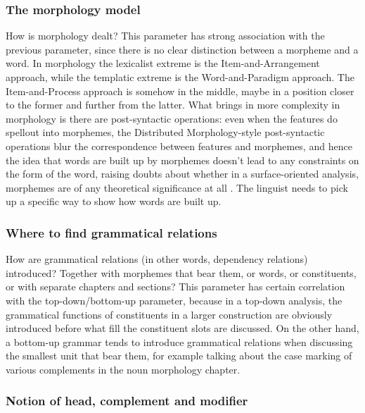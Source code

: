 \documentclass[UTF8, a4paper, oneside, scheme=plain]{ctexart}
\begin{document}
\subsubsection{The morphology model}

How is morphology dealt?
This parameter has strong association with the previous parameter, 
since there is no clear distinction between a morpheme and a word.
In morphology the lexicalist extreme is the Item-and-Arrangement approach,
while the templatic extreme is the Word-and-Paradigm approach.
The Item-and-Process approach is somehow in the middle, 
maybe in a position closer to the former and further from the latter. 
What brings in more complexity in morphology is 
there are post-syntactic operations:
even when the features do spellout into morphemes,
the Distributed Morphology-style post-syntactic operations 
blur the correspondence between features and morphemes,
and hence the idea that words are built up by morphemes 
doesn't lead to any constraints on the form of the word,
raising doubts about whether in a surface-oriented analysis,
morphemes are of any theoretical significance at all \citep{anderson2017words}.
The linguist needs to pick up a specific way to show how words are built up.

\subsubsection{Where to find grammatical relations}

How are grammatical relations (in other words, dependency relations) introduced? 
Together with morphemes that bear them, or words, or constituents, or with separate chapters and sections?
This parameter has certain correlation with the top-down/bottom-up parameter,
because in a top-down analysis,
the grammatical functions of constituents in a larger construction 
are obviously introduced before what fill the constituent slots are discussed.
On the other hand, 
a bottom-up grammar tends to introduce grammatical relations when discussing the smallest unit that bear them,
for example talking about the case marking of various complements in the noun morphology chapter.

\subsubsection{Notion of head, complement and modifier}\label{sec:what-is-head}
\end{document}
